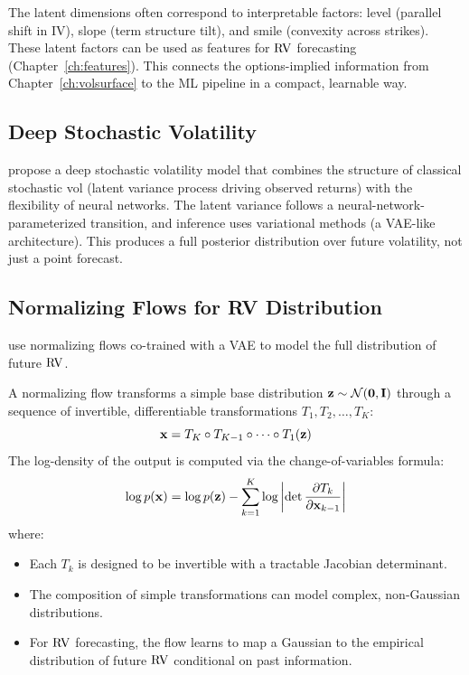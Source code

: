 \begin{application}
The latent dimensions often correspond to interpretable factors: level (parallel shift in IV), slope (term structure tilt), and smile (convexity across strikes).
These latent factors can be used as features for $\operatorname{RV}$ forecasting (Chapter~\ref{ch:features}).
This connects the options-implied information from Chapter~\ref{ch:volsurface} to the ML pipeline in a compact, learnable way.
\end{application}

\subsection{Deep Stochastic Volatility}

\citet{XuChen2021} propose a deep stochastic volatility model that combines the structure of classical stochastic vol (latent variance process driving observed returns) with the flexibility of neural networks.
The latent variance follows a neural-network-parameterized transition, and inference uses variational methods (a VAE-like architecture).
This produces a full posterior distribution over future volatility, not just a point forecast.

\subsection{Normalizing Flows for RV Distribution}

\citet{DuMoriyamaTanakaIshii2023} use normalizing flows co-trained with a VAE to model the full distribution of future $\operatorname{RV}$.

\begin{definition}
A normalizing flow transforms a simple base distribution $\mathbf{z} \sim \mathcal{N}(\mathbf{0}, \mathbf{I})$ through a sequence of invertible, differentiable transformations $T_1, T_2, \ldots, T_K$:
\begin{equation}\label{eq:nflow}
  \mathbf{x} = T_K \circ T_{K-1} \circ \cdots \circ T_1(\mathbf{z})
\end{equation}
The log-density of the output is computed via the change-of-variables formula:
\begin{equation}\label{eq:nflow-density}
  \log p(\mathbf{x}) = \log p(\mathbf{z}) - \sum_{k=1}^{K} \log \left| \det \frac{\partial T_k}{\partial \mathbf{x}_{k-1}} \right|
\end{equation}
where:
\begin{itemize}[nosep]
  \item Each $T_k$ is designed to be invertible with a tractable Jacobian determinant.
  \item The composition of simple transformations can model complex, non-Gaussian distributions.
  \item For $\operatorname{RV}$ forecasting, the flow learns to map a Gaussian to the empirical distribution of future $\operatorname{RV}$ conditional on past information.
\end{itemize}
\end{definition}

